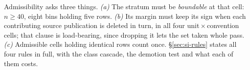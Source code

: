 Admissibility asks three things. \emph{(a)} The stratum must be \emph{boundable} at that cell:
$n\ge40$, eight bins holding five rows. \emph{(b)} Its margin must keep its sign when each
contributing source publication is deleted in turn, in all four unit\,$\times$\,convention cells;
that clause is load-bearing, since dropping it lets the set taken whole pass. \emph{(c)} Admissible
cells holding identical rows count once. \S\ref{sec:si-rules} states all four rules in full, with
the class cascade, the demotion test and what each of them costs.
